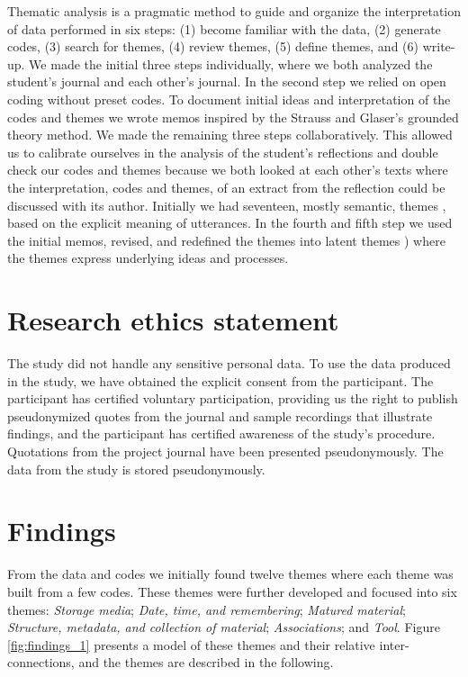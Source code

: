 \documentclass[runningheads,a4paper]{cmmr2023}
\begin{document}
Thematic analysis \cite{maguire2017,braun2006} is a pragmatic method to guide and organize the interpretation of data performed in six steps: (1) become familiar with the data, (2) generate codes, (3) search for themes, (4) review themes, (5) define themes, and (6) write-up. We made the initial three steps individually, where we both analyzed the student’s journal and each other's journal. In the second step we relied on open coding without preset codes. To document initial ideas and interpretation of the codes and themes we wrote memos inspired by the Strauss and Glaser’s \cite{glaser2017} grounded theory method. We made the remaining three steps collaboratively. This allowed us to calibrate ourselves in the analysis of the student’s reflections and double check our codes and themes because we both looked at each other's texts where the interpretation, codes and themes, of an extract from the reflection could be discussed with its author. Initially we had seventeen, mostly semantic, themes \cite{maguire2017}, based on the explicit meaning of utterances. In the fourth and fifth step we used the initial memos, revised, and redefined the themes into latent themes \cite{maguire2017}) where the themes express underlying ideas and processes.

\section{Research ethics statement}
The study did not handle any sensitive personal data. To use the data produced in the study, we have obtained the explicit consent from the participant. The participant has certified voluntary participation, providing us the right to publish pseudonymized quotes from the journal and sample recordings that illustrate findings, and the participant has certified awareness of the study’s procedure. Quotations from the project journal have been presented pseudonymously. The data from the study is stored pseudonymously.

\section{Findings}
From the data and codes we initially found twelve themes where each theme was built from a few codes. These themes were further developed and focused into six themes: \emph{Storage media}; \emph{Date, time, and remembering}; \emph{Matured material}; \emph{Structure, metadata, and collection of material}; \emph{Associations}; and \emph{Tool}. Figure \ref{fig:findings_1} presents a model of these themes and their relative inter-connections, and the themes are described in the following. 
\end{document}
